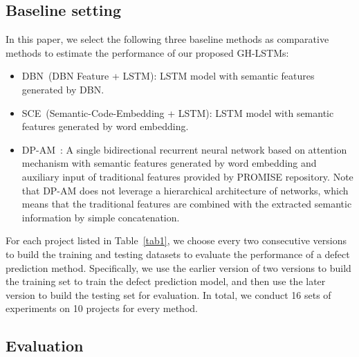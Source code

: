 \documentclass[journal]{IEEEtran}
\begin{document}
\subsection{Baseline setting}
In this paper, we select the following three baseline methods as comparative methods to estimate the performance of our proposed GH-LSTMs:
\begin{itemize}
	\item DBN~\cite{wang2018deep}(DBN Feature + LSTM): LSTM model with semantic features generated by DBN.
	\item SCE~\cite{liang2019seml}(Semantic-Code-Embedding + LSTM): LSTM model with semantic features generated by word embedding.
	\item DP-AM~\cite{fan2019deep}: A single bidirectional recurrent neural network based on attention mechanism with semantic features generated by word embedding and auxiliary input of traditional features provided by PROMISE repository. Note that DP-AM does not leverage a hierarchical architecture of networks, which means that the traditional features are combined with the extracted semantic information by simple concatenation.
\end{itemize}


For each project listed in Table~\ref{tab1}, we choose every two consecutive versions to build the training and testing datasets to evaluate the performance of a defect prediction method. Specifically, we use the earlier version of two versions to build the training set to train the defect prediction model, and then use the later version to build the testing set for evaluation. In total, we conduct 16 sets of experiments on 10 projects for every method.
\subsection{Evaluation}
\end{document}
